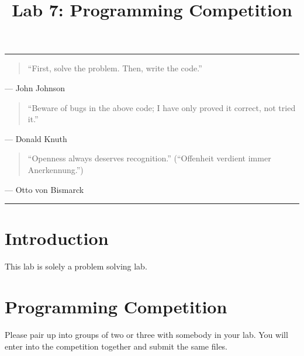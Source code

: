 \documentclass[11pt]{cselabheader}
\title{Lab 7: Programming Competition}
\theoremstyle{plain}
\begin{document}
\maketitle

\hrule

\begin{quotation}
	``First, solve the problem. Then, write the code.''
\end{quotation}
\begin{flushright}
	--- John Johnson
\end{flushright}

\begin{quotation} ``Beware of bugs in the above code; I have only proved it
	correct, not tried it.''
\end{quotation}
\begin{flushright}
	--- Donald Knuth
\end{flushright}

\begin{quotation}
	``Openness always deserves recognition.'' (``Offenheit verdient immer
	Anerkennung.'')
\end{quotation}
\begin{flushright}
	--- Otto von Bismarck

\end{flushright}

\hrule

\section{Introduction}

This lab is solely a problem solving lab.

\pagebreak
\section{Programming Competition}

Please pair up into groups of two or three with somebody in your lab. You will 
enter into the competition together and submit the same files. 
\end{document}
